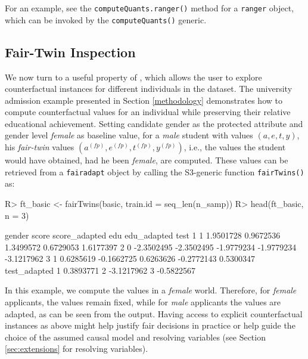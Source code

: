 \documentclass[
  nojss]{jss}
\begin{document}
For an example, see the \texttt{computeQuants.ranger()} method for a
\texttt{ranger} object, which can be invoked by the
\texttt{computeQuants()} generic.

\hypertarget{fair-twin-inspection}{%
\subsection{Fair-Twin Inspection}\label{fair-twin-inspection}}

We now turn to a useful property of , which allows the
user to explore counterfactual instances for different individuals in
the dataset. The university admission example presented in Section
\ref{methodology} demonstrates how to compute counterfactual values for
an individual while preserving their relative educational achievement.
Setting candidate gender as the protected attribute and gender level
\emph{female} as baseline value, for a \emph{male} student with values
\((a, e, t, y)\), his \emph{fair-twin} values
\(( {a}^{(fp)},  {e}^{(fp)},  {t}^{(fp)},  {y}^{(fp)})\), i.e., the
values the student would have obtained, had he been \emph{female}, are
computed. These values can be retrieved from a \texttt{fairadapt} object
by calling the S3-generic function \texttt{fairTwins()} as:

\begin{CodeChunk}
\begin{CodeInput}
R> ft_basic <- fairTwins(basic, train.id = seq_len(n_samp))
R> head(ft_basic, n = 3)
\end{CodeInput}
\begin{CodeOutput}
  gender      score score_adapted        edu edu_adapted       test
1      1  1.9501728     0.9672536  1.3499572   0.6729053  1.6177397
2      0 -2.3502495    -2.3502495 -1.9779234  -1.9779234 -3.1217962
3      1  0.6285619    -0.1662725  0.6263626  -0.2772143  0.5300347
  test_adapted
1    0.3893771
2   -3.1217962
3   -0.5822567
\end{CodeOutput}
\end{CodeChunk}

In this example, we compute the values in a \emph{female} world.
Therefore, for \emph{female} applicants, the values remain fixed, while
for \emph{male} applicants the values are adapted, as can be seen from
the output. Having access to explicit counterfactual instances as above
might help justify fair decisions in practice or help guide the choice
of the assumed causal model and resolving variables (see Section
\ref{sec:extensions} for resolving variables).
\end{document}
